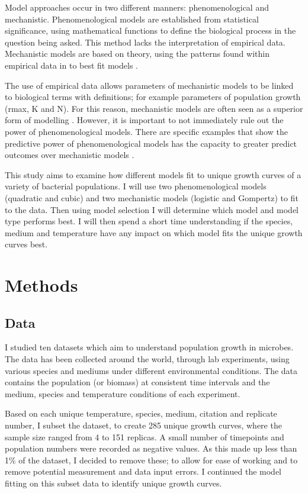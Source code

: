 \documentclass[11pt]{article}
\begin{document}
Model approaches occur in two different manners: phenomenological and mechanistic. Phenomenological models are established from statistical significance, using mathematical functions to define the biological process in the question being asked. This method lacks the interpretation of empirical data. Mechanistic models are based on theory, using the patterns found within empirical data in  to best fit models \cite{geritz_mathematical_2012, white_should_2019} .

The use of empirical data allows parameters of mechanistic models to be linked to biological terms with definitions; for example parameters of population growth (r\textunderscore max, K and N). For this reason, mechanistic models are often seen as a superior form of modelling \cite{geritz_mathematical_2012, white_should_2019}. However, it is important to not immediately rule out the power of phenomenological models. There are specific examples that show the predictive power of phenomenological models \cite{white_should_2019, kozlowski_optimal_1992} has the capacity to greater predict outcomes over mechanistic models \newline  \cite{white_should_2019}.

This study aims to examine how different models fit to unique growth curves of a variety of bacterial populations. I will use two phenomenological models (quadratic and cubic) and two mechanistic models (logistic and Gompertz) to fit to the data. Then using model selection I will determine which model and model type performs best. I will then spend a short time understanding if the species, medium and temperature have any impact on which model fits the unique growth curves best.  

\section{Methods}

\subsection{Data} 
I studied ten datasets which aim to understand population growth in microbes. The data has been collected around the world, through lab experiments, using various species and mediums under different environmental conditions. The data contains the population (or biomass) at consistent time intervals and the medium, species and temperature conditions of each experiment.

Based on each unique temperature, species, medium, citation and replicate number, I subset the dataset, to create 285 unique growth curves, where the sample size ranged from 4 to 151 replicas.  A small number of timepoints and population numbers were recorded as negative values. As this made up less than 1\% of the dataset, I decided to remove these; to allow for ease of working and to remove potential measurement and data input errors. I continued the model fitting on this subset data to identify unique growth curves. 
\end{document}
